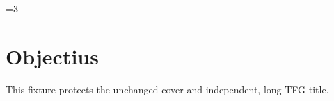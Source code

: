 \documentclass[CAT,TFG,PR,cover,no-toc]{P3CTeX}
\begin{document}
\ifnum\value{page}=3\relax\else
\fi
\section{Objectius}
This fixture protects the unchanged cover and independent, long TFG title.
\end{document}
